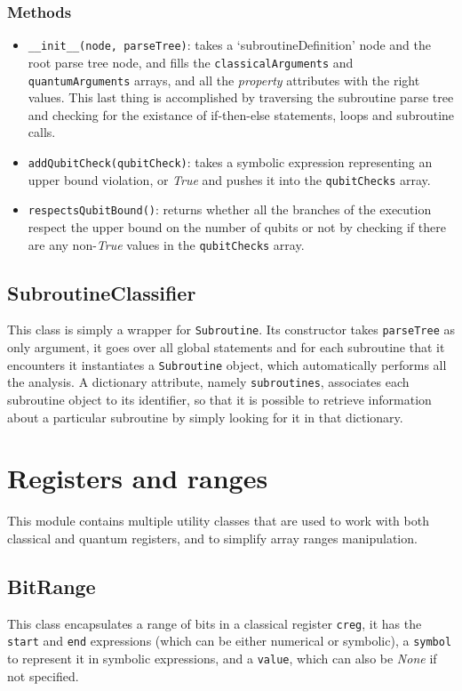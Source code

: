\documentclass[12pt,a4paper]{report}
\theoremstyle{definition}
\theoremstyle{definition}
\theoremstyle{definition}
\begin{document}
\subsubsection{Methods}
\begin{itemize}
    \itemsep 0em
    \item \texttt{\_\_init\_\_(node, parseTree)}: takes a `subroutineDefinition' node and the root parse tree node, and fills the \texttt{classicalArguments} and \texttt{quantumArguments} arrays, and all the \textit{property} attributes with the right values. This last thing is accomplished by traversing the subroutine parse tree and checking for the existance of if-then-else statements, loops and subroutine calls.
    \item \texttt{addQubitCheck(qubitCheck)}: takes a symbolic expression representing an upper bound violation, or \textit{True} and pushes it into the \texttt{qubitChecks} array.
    \item \texttt{respectsQubitBound()}: returns whether all the branches of the execution respect the upper bound on the number of qubits or not by checking if there are any non-\textit{True} values in the \texttt{qubitChecks} array.
\end{itemize}

\subsection{SubroutineClassifier}
This class is simply a wrapper for \texttt{Subroutine}. Its constructor takes \texttt{parseTree} as only argument, it goes over all global statements and for each subroutine that it encounters it instantiates a \texttt{Subroutine} object, which automatically performs all the analysis. A dictionary attribute, namely \texttt{subroutines}, associates each subroutine object to its identifier, so that it is possible to retrieve information about a particular subroutine by simply looking for it in that dictionary.

\section{Registers and ranges}
This module contains multiple utility classes that are used to work with both classical and quantum registers, and to simplify array ranges manipulation.


\subsection{BitRange}
This class encapsulates a range of bits in a classical register \texttt{creg}, it has the \texttt{start} and \texttt{end} expressions (which can be either numerical or symbolic), a \texttt{symbol} to represent it in symbolic expressions, and a \texttt{value}, which can also be \textit{None} if not specified.
\end{document}

